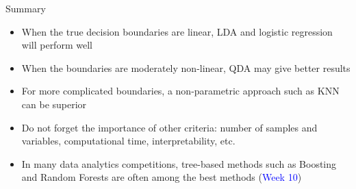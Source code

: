 \documentclass[14pt]{beamer}
\begin{document}
\begin{frame}{Summary}\small
	\begin{itemize}
		\item When the true decision boundaries are linear, LDA and logistic regression will perform well
		\item When the boundaries are moderately non-linear, QDA may give better results
		\item For more complicated boundaries, a non-parametric approach such as KNN can be superior
		\item Do not forget the importance of other criteria: number of samples and variables, computational time, interpretability, etc.
		\item In many data analytics competitions, tree-based methods such as Boosting and Random Forests are often among the best methods (\textcolor{blue}{Week 10})
	\end{itemize}
\end{frame}
\end{document}
